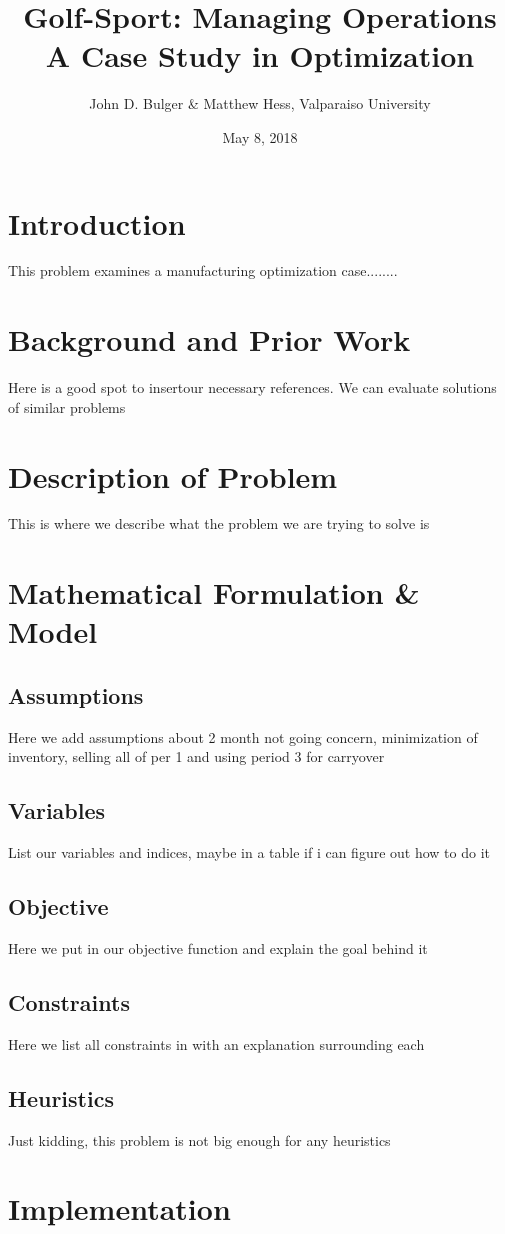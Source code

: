 \documentclass{article}
\title{Golf-Sport:  Managing Operations \\ A Case Study in Optimization}
\date{May 8, 2018}
\author{John D. Bulger \& Matthew Hess, Valparaiso University}
\begin{document}
	\maketitle
	\newpage
\section{Introduction}
This problem examines a manufacturing optimization case........
\section{Background and Prior Work}
Here is a good spot to insertour necessary references.  We can evaluate solutions of similar problems
\section{Description of Problem}
This is where we describe what the problem we are trying to solve is
\section{Mathematical Formulation \& Model}
\subsection{Assumptions}
Here we add assumptions about 2 month not going concern, minimization of inventory, selling all of per 1 and using period 3 for carryover
\subsection{Variables}
List our variables and indices, maybe in a table if i can figure out how to do it
\subsection{Objective}
Here we put in our objective function and explain the goal behind it
\subsection{Constraints}
Here we list all constraints in with an explanation surrounding each
\subsection{Heuristics}
Just kidding, this problem is not big enough for any heuristics
\section{Implementation}
\end{document}
